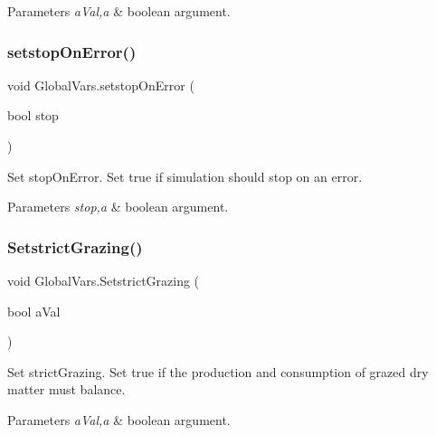 \begin{DoxyParams}{Parameters}
{\em a\+Val,a} & boolean argument. \\
\hline
\end{DoxyParams}
\mbox{\label{class_global_vars_ac8f9c5d7b120a129ca545b072ed7d178}} 
\subsubsection{\texorpdfstring{setstopOnError()}{setstopOnError()}}
{\footnotesize\ttfamily void Global\+Vars.\+setstop\+On\+Error (\begin{DoxyParamCaption}\item[{bool}]{stop }\end{DoxyParamCaption})\hspace{0.3cm}{\ttfamily [inline]}}



Set stop\+On\+Error. Set true if simulation should stop on an error. 


\begin{DoxyParams}{Parameters}
{\em stop,a} & boolean argument. \\
\hline
\end{DoxyParams}
\mbox{\label{class_global_vars_ab73daa54d4af7b798bb13364b91c6026}} 
\subsubsection{\texorpdfstring{SetstrictGrazing()}{SetstrictGrazing()}}
{\footnotesize\ttfamily void Global\+Vars.\+Setstrict\+Grazing (\begin{DoxyParamCaption}\item[{bool}]{a\+Val }\end{DoxyParamCaption})\hspace{0.3cm}{\ttfamily [inline]}}



Set strict\+Grazing. Set true if the production and consumption of grazed dry matter must balance. 


\begin{DoxyParams}{Parameters}
{\em a\+Val,a} & boolean argument. \\
\hline
\end{DoxyParams}
\mbox{\label{class_global_vars_aa0e41152bee501f128dc362540652326}} 
